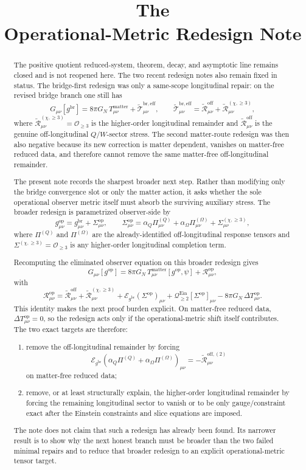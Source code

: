 \documentclass[11pt]{article}
\title{\textbf{The \TheoryName{}}\\[0.4em]
\large Operational-Metric Redesign Note}
\author{}
\date{}
\newcommand{\ReBridge}{g^{\mathrm{br}}}
\newcommand{\OpMetric}{g^{\mathrm{op}}}
\newcommand{\PiQ}{\Pi^{(Q)}}
\newcommand{\PiOmega}{\Pi^{(\Omega)}}
\newcommand{\SigmaOp}{\Sigma^{\mathrm{op}}}
\newcommand{\SigmaLong}{\Sigma^{(\chi,\ge 3)}}
\newcommand{\ReEff}{\widetilde{\mathcal T}_{\mu\nu}^{\mathrm{br,eff}}}
\newcommand{\ReLong}{\widetilde{\mathcal R}_{\mu\nu}^{(\chi,\ge 3)}}
\newcommand{\ReOff}{\widetilde{\mathcal R}_{\mu\nu}^{\mathrm{off}}}
\newcommand{\ReOffTwo}{\widetilde{\mathcal R}_{\mu\nu}^{\mathrm{off},(2)}}
\newcommand{\DeltaTop}{\Delta T_{\mu\nu}^{\mathrm{op}}}
\newcommand{\EinLin}{\mathcal E_{\ReBridge}}
\newcommand{\EinQuad}{\mathcal Q_{\ge 2}^{\mathrm{Ein}}}
\begin{document}
\maketitle

\begin{abstract}
The positive quotient reduced-system, theorem, decay, and asymptotic line remains closed and is not reopened here. The two recent redesign notes also remain fixed in status. The bridge-first redesign was only a same-scope longitudinal repair: on the revised bridge branch one still has
\[
G_{\mu\nu}[\ReBridge]
=
8\pi G_N\,T_{\mu\nu}^{\mathrm{matter}}
+\ReEff,
\qquad
\ReEff=\ReOff+\ReLong,
\]
where \(\ReLong=\mathcal O_{\ge 3}\) is the higher-order longitudinal remainder and \(\ReOff\) is the genuine off-longitudinal \(Q/W\)-sector stress. The second matter-route redesign was then also negative because its new correction is matter dependent, vanishes on matter-free reduced data, and therefore cannot remove the same matter-free off-longitudinal remainder.

The present note records the sharpest broader next step. Rather than modifying only the bridge convergence slot or only the matter action, it asks whether the sole operational observer metric itself must absorb the surviving auxiliary stress. The broader redesign is parametrized observer-side by
\[
\OpMetric_{\mu\nu}
=
\ReBridge_{\mu\nu}
+\SigmaOp_{\mu\nu},
\qquad
\SigmaOp_{\mu\nu}
=
\alpha_Q\PiQ_{\mu\nu}
+\alpha_\Omega\PiOmega_{\mu\nu}
+\SigmaLong_{\mu\nu},
\]
where \(\PiQ\) and \(\PiOmega\) are the already-identified off-longitudinal response tensors and \(\SigmaLong=\mathcal O_{\ge 3}\) is any higher-order longitudinal completion term.

Recomputing the eliminated observer equation on this broader redesign gives
\[
G_{\mu\nu}[\OpMetric]
=
8\pi G_N\,T_{\mu\nu}^{\mathrm{matter}}[\OpMetric,\psi]
+\mathcal R_{\mu\nu}^{\mathrm{op}},
\]
with
\[
\mathcal R_{\mu\nu}^{\mathrm{op}}
=
\ReOff+\ReLong
+\EinLin(\SigmaOp)_{\mu\nu}
+\EinQuad[\SigmaOp]_{\mu\nu}
-8\pi G_N\,\DeltaTop.
\]
This identity makes the next proof burden explicit. On matter-free reduced data, \(\DeltaTop=0\), so the redesign acts only if the operational-metric shift itself contributes. The two exact targets are therefore:
\begin{enumerate}
    \item remove the off-longitudinal remainder by forcing
    \[
    \EinLin(\alpha_Q\PiQ+\alpha_\Omega\PiOmega)_{\mu\nu}
    =
    -\ReOffTwo
    \]
    on matter-free reduced data;
    \item remove, or at least structurally explain, the higher-order longitudinal remainder by forcing the remaining longitudinal sector to vanish or to be only gauge/constraint exact after the Einstein constraints and slice equations are imposed.
\end{enumerate}
The note does not claim that such a redesign has already been found. Its narrower result is to show why the next honest branch must be broader than the two failed minimal repairs and to reduce that broader redesign to an explicit operational-metric tensor target.
\end{abstract}
\end{document}
